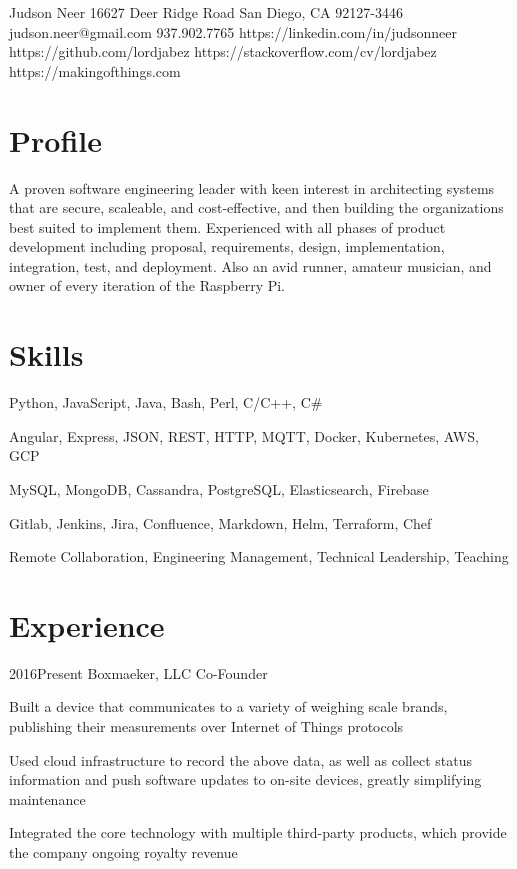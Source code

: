 \documentclass[9pt]{article}
\begin{document}
\header
  {Judson Neer}
  {16627 Deer Ridge Road}
  {San Diego, CA 92127-3446}
  {judson.neer@gmail.com}
  {937.902.7765}
  {https://linkedin.com/in/judsonneer}
  {https://github.com/lordjabez}
  {https://stackoverflow.com/cv/lordjabez}
  {https://makingofthings.com}


\section{Profile}

A proven software engineering leader with keen interest in architecting systems that are secure, scaleable, and cost-effective, and then building the organizations best suited to implement them. Experienced with all phases of product development including proposal, requirements, design, implementation, integration, test, and deployment. Also an avid runner, amateur musician, and owner of every iteration of the Raspberry Pi.


\section{Skills}

  {Python, JavaScript, Java, Bash, Perl, C/C++, C\#}

  {Angular, Express, JSON, REST, HTTP, MQTT, Docker, Kubernetes, AWS, GCP}

  {MySQL, MongoDB, Cassandra, PostgreSQL, Elasticsearch, Firebase}

  {Gitlab, Jenkins, Jira, Confluence, Markdown, Helm, Terraform, Chef}

  {Remote Collaboration, Engineering Management, Technical Leadership, Teaching}


\section{Experience}

\job
  {2016}{Present}
  {Boxmaeker, LLC}
  {Co-Founder}
  {\begin{achievements}
    \item Built a device that communicates to a variety of weighing scale brands, publishing their measurements over Internet of Things protocols
    \item Used cloud infrastructure to record the above data, as well as collect status information and push software updates to on-site devices, greatly simplifying maintenance
    \item Integrated the core technology with multiple third-party products, which provide the company ongoing royalty revenue
  \end{achievements}}
\end{document}
